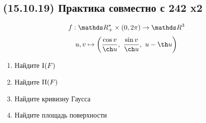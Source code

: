 \documentclass[main]{subfiles}
\begin{document}
    \subsection{(15.10.19) Практика совместно с 242 x2}

    \begin{Example}
      \[f: \R_+^* \times (0, 2\pi) \ra \R^3\]
      \[u,v \mapsto \Br{\dfrac{\cos v}{\ch u},\ \dfrac{\sin v}{\ch u},\ u - \th u}\]
      \begin{enumerate}
        \item Найдите $\RNumb{1}(F)$
        \item Найдите $\RNumb{2}(F)$
        \item Найдите кривизну Гаусса
        \item Найдите площадь поверхности
      \end{enumerate}
    \end{Example}
\end{document}
